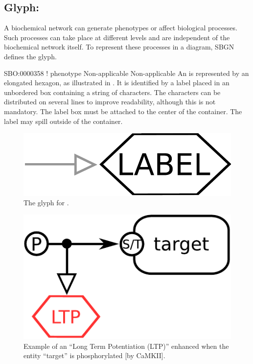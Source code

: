 
\color{ForestGreen}

\subsection{Glyph: }
\label{sec:observable}

A biochemical network can generate phenotypes or affect biological
processes.  Such processes can take place at different levels and are
independent of the biochemical network itself.  To represent these
processes in a diagram, SBGN defines the  glyph.

\begin{glyphDescription}

\glyphSboTerm SBO:0000358 ! phenotype
\glyphOrigin Non-applicable
\glyphTarget Non-applicable
\glyphEndPoint An  is represented by an elongated
hexagon, as illustrated in . It is identified by a label placed in an
unbordered box containing a string of characters.  The characters can be
distributed on several lines to improve readability, although this is not
mandatory.  The label box must be attached to the center of the
 container.  The label may spill outside of the container.

\end{glyphDescription}
 
\begin{figure}[H]
  \centering
  \includegraphics[scale = 0.3]{images/observable}
  \caption{The \ER glyph for .}
  \label{fig:observable}
\end{figure}

\begin{figure}[H]
  \centering
  \includegraphics[scale = 0.5]{examples/ex-observable}
  \caption{Example of an  ``Long Term Potentiation (LTP)'' enhanced when the entity ``target'' is phosphorylated [by CaMKII].}
  \label{fig:ex-observable}
\end{figure}

\normalcolor
